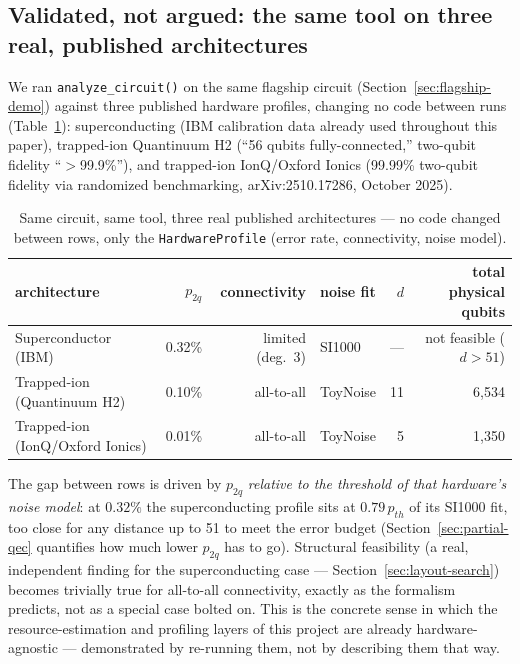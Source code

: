 \documentclass[9pt,twocolumn]{extarticle}
\begin{document}
\subsection{Validated, not argued: the same tool on three real, published architectures}
\label{sec:cross-arch}
We ran \texttt{analyze\_circuit()} on the same flagship circuit
(Section~\ref{sec:flagship-demo}) against three published hardware
profiles, changing no code between runs (Table~\ref{tab:cross-arch}):
superconducting (IBM calibration data already used throughout this
paper), trapped-ion Quantinuum H2 (``56 qubits fully-connected,''
two-qubit fidelity ``$>$99.9\%''), and trapped-ion IonQ/Oxford Ionics
(99.99\% two-qubit fidelity via randomized benchmarking, arXiv:2510.17286,
October 2025).
\begin{table}[h]
\centering
\begin{tabular}{lrrlrr}
\toprule
architecture & $p_{2q}$ & connectivity & noise fit & $d$ & total physical qubits \\
\midrule
Superconductor (IBM) & 0.32\% & limited (deg.\ 3) & SI1000 & --- & not feasible ($d>51$) \\
Trapped-ion (Quantinuum H2) & 0.10\% & all-to-all & ToyNoise & 11 & 6{,}534 \\
Trapped-ion (IonQ/Oxford Ionics) & 0.01\% & all-to-all & ToyNoise & 5 & 1{,}350 \\
\bottomrule
\end{tabular}
\caption{Same circuit, same tool, three real published architectures --- no
code changed between rows, only the \texttt{HardwareProfile} (error rate,
connectivity, noise model).}
\label{tab:cross-arch}
\end{table}
The gap between rows is driven by $p_{2q}$ \emph{relative to the
threshold of that hardware's noise model}: at $0.32\%$ the superconducting
profile sits at $0.79\,p_{th}$ of its SI1000 fit, too close for any distance
up to 51 to meet the error budget (Section~\ref{sec:partial-qec} quantifies
how much lower $p_{2q}$ has to go). Structural feasibility (a real,
independent finding for the superconducting case --- Section~\ref{sec:layout-search})
becomes trivially true for all-to-all connectivity, exactly as the
formalism predicts, not as a special case bolted on. This is the concrete
sense in which the resource-estimation and profiling layers of this
project are already hardware-agnostic --- demonstrated by re-running them,
not by describing them that way.
\end{document}
